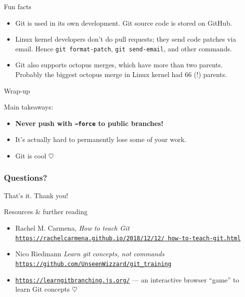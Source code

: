 \documentclass{beamer}
\begin{document}
    \begin{frame}{Fun facts}

        \begin{itemize}
            \item Git is used in its own development. Git source code is stored on GitHub.
            \item Linux kernel developers don't do pull requests; they send code patches via email.
            Hence \texttt{git format-patch}, \texttt{git send-email}, and other commands.


            \href{https://github.com/torvalds/linux/pull/17\#issuecomment-5654674}{}
            \item Git also supports octopus merges, which have more than two parents. Probably
                the biggest octopus merge in Linux kernel had 66 (!) parents.

            \href{https://www.destroyallsoftware.com/blog/2017/the-biggest-and-weirdest-commits-in-linux-kernel-git-history}{}
        \end{itemize}

    \end{frame}


    \begin{frame}{Wrap-up}

        Main takeaways:
        \begin{itemize}
            \item \textbf{Never push with \texttt{--force} to public branches!}
            \item It's actually hard to permanently lose some of your work.
            \item Git is cool $\heartsuit$
        \end{itemize}

    \end{frame}


    \begin{frame}
        \frametitle{Questions?}
        \centering
        That's it. Thank you!
    \end{frame}


    \begin{frame}{Resources \& further reading}

        \begin{itemize}
            \item<1-> Rachel M. Carmena, \emph{How to teach Git}
                \href{https://rachelcarmena.github.io/2018/12/12/how-to-teach-git.html}{\texttt{https://rachelcarmena.github.io/2018/12/12/
                how-to-teach-git.html}}
            \item<1-> Nico Riedmann \emph{Learn git concepts, not commands} \href{https://github.com/UnseenWizzard/git_training}{\texttt{https://github.com/UnseenWizzard/git\_training}}
            \item<1-> \href{https://learngitbranching.js.org/}{\texttt{https://learngitbranching.js.org/}} --- an interactive browser ``game'' to learn Git concepts $\heartsuit$
        \end{itemize}

    \end{frame}
\end{document}
